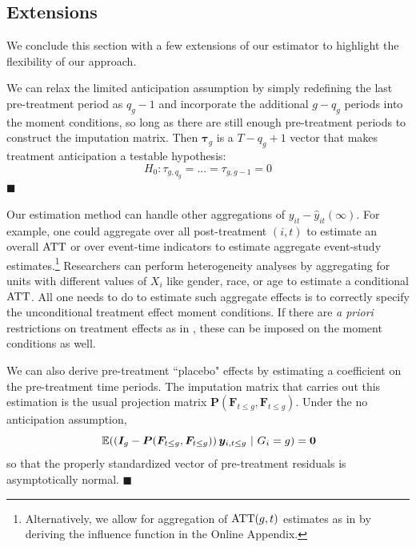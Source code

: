 \documentclass[12pt]{article}
\begin{document}
\subsection{Extensions}

We conclude this section with a few extensions of our estimator to highlight the flexibility of our approach.

\begin{remark}
We can relax the limited anticipation assumption by simply redefining the last pre-treatment period as $q_g - 1$ and incorporate the additional $g - q_g$ periods into the moment conditions, so long as there are still enough pre-treatment periods to construct the imputation matrix. Then $\bm \tau_g$ is a $T - q_g + 1$ vector that makes treatment anticipation a testable hypothesis:
\begin{equation}
H_0: \tau_{g,q_g} = ... = \tau_{g,g-1} = 0 
\end{equation}
$\blacksquare$
\end{remark} 

\begin{remark}

Our estimation method can handle other aggregations of $y_{it} - \hat{y}_{it}(\infty)$. For example, one could aggregate over all post-treatment $(i,t)$ to estimate an overall $\text{ATT}$ or over event-time indicators to estimate aggregate event-study estimates.\footnote{Alternatively, we allow for aggregation of $\text{ATT}(g,t)$ estimates as in \citet{Callaway_Santanna_2021} by deriving the influence function in the Online Appendix.
} Researchers can perform heterogeneity analyses by aggregating for units with different values of $X_i$ like gender, race, or age to estimate a conditional $\text{ATT}$. All one needs to do to estimate such aggregate effects is to correctly specify the unconditional treatment effect moment conditions. If there are \emph{a priori} restrictions on treatment effects as in \citet{Borusyak_Jaravel_Spiess_2021}, these can be imposed on the moment conditions as well. 

We can also derive pre-treatment ``placebo" effects by estimating a coefficient on the pre-treatment time periods. The imputation matrix that carries out this estimation is the usual projection matrix $\bm P(\bm{F}_{t \leq g}, \bm{F}_{t \leq g})$. Under the no anticipation assumption, 
\begin{equation}
  \expec{ \left( \bm I_{g} - \bm P(\bm{F}_{t \leq g}, \bm{F}_{t \leq g}) \right) \bm y_{i, t \leq g}}{G_i = g} = \bm 0
\end{equation}
so that the properly standardized vector of pre-treatment residuals is asymptotically normal. $\blacksquare$
\end{remark}
\end{document}
